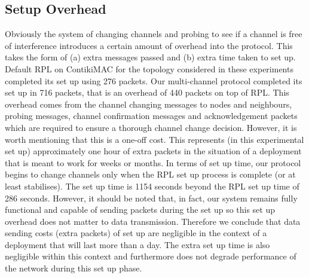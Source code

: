 \subsection{Setup Overhead}
Obviously the system of changing channels and probing to see if a channel is free of interference introduces a certain amount of overhead into
the protocol. This takes the form of (a) extra messages passed and (b) extra time taken to set up. Default RPL on ContikiMAC for the topology considered in these experiments completed its set up using 276 packets. Our multi-channel protocol completed its set up in 716 packets, that is an overhead of 440 packets on top of RPL. 
This overhead comes from the channel changing messages to nodes and neighbours, probing messages, channel confirmation messages and acknowledgement packets which are required to ensure a thorough channel change decision.
However, it is worth mentioning that this is a one-off cost. This represents (in this experimental set up) approximately one hour of extra packets in the situation of a deployment that is meant to work for weeks or months.  In terms of set up time, our protocol begins to change channels only when the RPL set up process is complete (or at least stabilises). The set up time is 1154 seconds beyond the RPL set up time of 286 seconds. However, it should be noted that, in fact, our system remains fully functional and capable of sending packets during the set up so this set up overhead does not matter to data transmission.
Therefore we conclude that data sending costs (extra packets) of set up are negligible in the context of a deployment that will last more than a day. The extra set up time is also negligible within this context and furthermore does not degrade performance of the network during this set up phase.